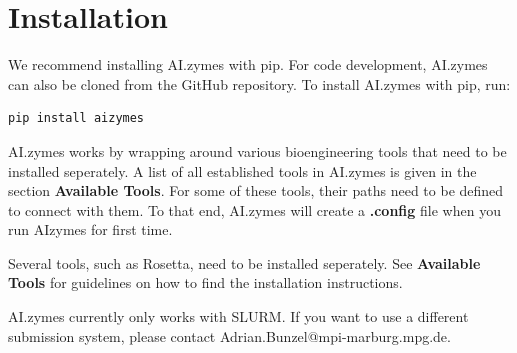 \documentclass[10pt]{extarticle}
\let\oldsection\section
\renewcommand{\section}[1]{\clearpage\oldsection{#1}}
\begin{document}

\clearpage
{}
\setcounter{page}{1}

\clearpage{}\setcounter{page}{1}
\let\sectionTemp=\section
\let\section=\oldsection
\clearpage
{\tableofcontents}
\clearpage
\let\section=\sectionTemp

\clearpage{}\setcounter{page}{1}
\section{Installation}

We recommend installing AI.zymes with pip. For code development, AI.zymes can also be cloned from the GitHub repository. To install AI.zymes with pip, run:

\vspace*{0.5\baselineskip}
\begin{lstlisting}[basicstyle=\color{black}\fontsize{9}{11}\selectfont\ttfamily, frame=single, rulecolor=\color{black}, breaklines=true]
pip install aizymes
\end{lstlisting}
\vspace*{0.5\baselineskip}

AI.zymes works by wrapping around various bioengineering tools that need to be installed seperately. A list of all established tools in AI.zymes is given in the section \textbf{Available Tools}. For some of these tools, their paths need to be defined to connect with them. To that end, AI.zymes will create a \textbf{.config} file when you run AIzymes for first time. 

\begin{tcolorbox}[colback=mpgAccentBlue!20!white,colframe=mpgAccentBlue!80!black,title=Note]
Several tools, such as Rosetta, need to be installed seperately. See \textbf{Available Tools} for guidelines on how to find the installation instructions.
\end{tcolorbox}

\begin{tcolorbox}[colback=mpgAccentOrange!20!white,colframe=mpgAccentOrange!80!black,title=Warning]
AI.zymes currently only works with SLURM.
If you want to use a different submission system, please contact Adrian.Bunzel@mpi-marburg.mpg.de.
\end{tcolorbox}
\end{document}
